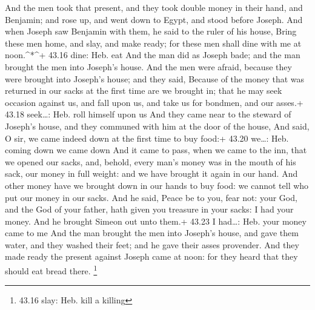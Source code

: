  And the men took that present, and they took double money
in their hand, and Benjamin; and rose up, and went down to Egypt, and
stood before Joseph.  And when Joseph saw Benjamin with
them, he said to the ruler of his house, Bring these men home, and slay,
and make ready; for these men shall dine with me at noon.\^{}*\^{}+
43.16 dine: Heb. eat  And the man did as Joseph bade; and
the man brought the men into Joseph's house.  And the men
were afraid, because they were brought into Joseph's house; and they
said, Because of the money that was returned in our sacks at the first
time are we brought in; that he may seek occasion against us, and fall
upon us, and take us for bondmen, and our asses.+ 43.18 seek\ldots: Heb.
roll himself upon us  And they came near to the steward of
Joseph's house, and they communed with him at the door of the house,
 And said, O sir, we came indeed down at the first time to
buy food:+ 43.20 we\ldots: Heb. coming down we came down 
And it came to pass, when we came to the inn, that we opened our sacks,
and, behold, every man's money was in the mouth of his sack, our money
in full weight: and we have brought it again in our hand. 
And other money have we brought down in our hands to buy food: we cannot
tell who put our money in our sacks.  And he said, Peace be
to you, fear not: your God, and the God of your father, hath given you
treasure in your sacks: I had your money. And he brought Simeon out unto
them.+ 43.23 I had\ldots: Heb. your money came to me  And
the man brought the men into Joseph's house, and gave them water, and
they washed their feet; and he gave their asses provender. 
And they made ready the present against Joseph came at noon: for they
heard that they should eat bread there. \footnote{43.16 slay: Heb. kill
  a killing}

